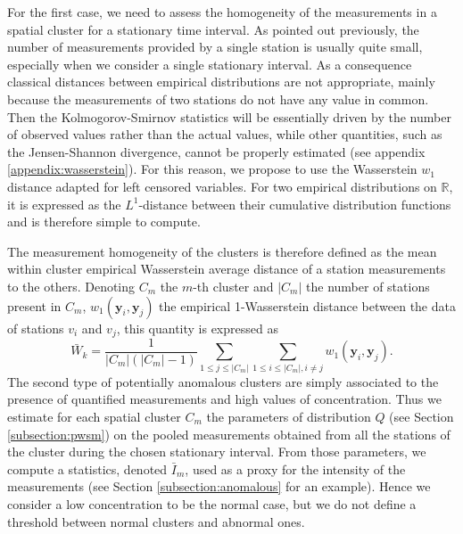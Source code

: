 For the first case, we need to assess the homogeneity of the measurements  in a spatial cluster for a stationary time interval. As pointed out previously, the number of measurements provided by a single station is usually quite small, especially when we consider a single stationary interval. As a consequence classical distances between empirical distributions are not appropriate, mainly because the measurements of two stations do not have any value in common. Then the Kolmogorov-Smirnov statistics will be essentially driven by the number of observed values rather than the actual values, while other quantities, such as the Jensen-Shannon divergence, cannot be properly estimated (see appendix \ref{appendix:wasserstein}). For this reason, we propose to use the Wasserstein $w_1$ distance \cite{villani2009optimal} adapted for left censored variables. For two empirical distributions on $\mathbb{R}$, it is expressed as the $L^1$-distance between their cumulative distribution functions and is therefore simple to compute. 

The measurement homogeneity of the clusters is therefore defined as the mean within cluster empirical Wasserstein average distance of a station measurements to the others. 
Denoting $C_m$ the $m$-th cluster and $|C_m|$ the number of stations present in $C_m$, $w_1(\mathbf{y}_i,\mathbf{y}_j)$ the empirical 1-Wasserstein distance between the data of stations $v_i$ and $v_j$, this quantity is expressed as   
\begin{equation}
    \bar{W}_k = \frac{1}{|C_m|(|C_m|-1)}\sum_{1 \leq j \leq |C_m|}\sum_{1 \leq i \leq |C_m|, i \neq j}w_1(\mathbf{y}_i,\mathbf{y}_j).
\end{equation}
The second type of potentially anomalous clusters are simply associated to the presence of quantified measurements and high values of concentration. Thus we estimate for each spatial cluster $C_m$ the parameters of distribution $Q$ (see Section \ref{subsection:pwsm}) on the pooled measurements obtained from all the stations of the cluster during the chosen stationary interval. From those parameters, we compute a statistics, denoted $\bar{I}_m$, used as a proxy for the intensity of the measurements (see Section \ref{subsection:anomalous} for an example).  Hence we consider a low concentration to be the normal case, but we do not define a threshold between normal clusters and abnormal ones. 

